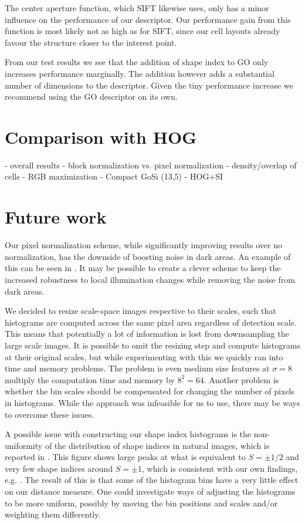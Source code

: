\documentclass[thesis.tex]{subfiles}
\begin{document}
The center aperture function, which SIFT likewise uses, only has a minor influence on the performance of our descriptor. Our performance gain from this function is most likely not as high as for SIFT, since our cell layouts already favour the structure closer to the interest point.

From our test results we see that the addition of shape index to GO only increases performance marginally. The addition however adds a substantial number of dimensions to the descriptor.
Given the tiny performance increase we recommend using the GO descriptor on its own.

\section{Comparison with HOG}
- overall results
- block normalization vs. pixel normalization
- density/overlap of cells
- RGB maximization
- Compact GoSi (13,5)
- HOG+SI

\section{Future work} %
%
Our pixel normalization scheme, while significantly improving results over no normalization, has the downside of boosting noise in dark areas. An example of this can be seen in . It may be possible to create a clever scheme to keep the increased robustness to local illumination changes while removing the noise from dark areas.

We decided to resize scale-space images respective to their scales, such that histograms are computed across the same pixel area regardless of detection scale. This means that potentially a lot of information is lost from downsampling the large scale images. It is possible to omit the resizing step and compute histograms at their original scales, but while experimenting with this we quickly ran into time and memory problems. The problem is even medium size features at $\sigma = 8$ multiply the computation time and memory by $8^2 = 64$. Another problem is whether the bin scales should be compensated for changing the number of pixels in histograms. While the approach was infeasible for us to use, there may be ways to overcome these issues.

A possible issue with constructing our shape index histograms is the non-uniformity of the distribution of shape indices in natural images, which is reported in \citep[Fig. 3]{lillholm2009statistics}. This figure shows large peaks at what is equivalent to $S = \pm 1/2$ and very few shape indices around $S = \pm 1$, which is consistent with our own findings, e.g. . The result of this is that some of the histogram bins have a very little effect on our distance measure. One could investigate ways of adjusting the histograms to be more uniform, possibly by moving the bin positions and scales and/or weighting them differently.
\end{document}
